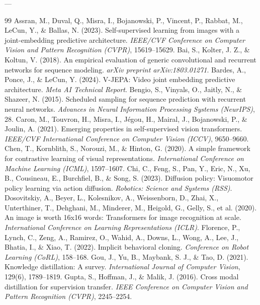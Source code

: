 \documentclass[11pt,a4paper]{article}
\begin{document}
---

\begin{thebibliography}{99}
 Assran, M., Duval, Q., Misra, I., Bojanowski, P., Vincent, P., Rabbat, M., LeCun, Y., \& Ballas, N. (2023). Self-supervised learning from images with a joint-embedding predictive architecture. \textit{IEEE/CVF Conference on Computer Vision and Pattern Recognition (CVPR)}, 15619--15629.
 Bai, S., Kolter, J. Z., \& Koltun, V. (2018). An empirical evaluation of generic convolutional and recurrent networks for sequence modeling. \textit{arXiv preprint arXiv:1803.01271}.
 Bardes, A., Ponce, J., \& LeCun, Y. (2024). V-JEPA: Video joint embedding predictive architecture. \textit{Meta AI Technical Report}.
 Bengio, S., Vinyals, O., Jaitly, N., \& Shazeer, N. (2015). Scheduled sampling for sequence prediction with recurrent neural networks. \textit{Advances in Neural Information Processing Systems (NeurIPS)}, 28.
 Caron, M., Touvron, H., Misra, I., J\'egou, H., Mairal, J., Bojanowski, P., \& Joulin, A. (2021). Emerging properties in self-supervised vision transformers. \textit{IEEE/CVF International Conference on Computer Vision (ICCV)}, 9650--9660.
 Chen, T., Kornblith, S., Norouzi, M., \& Hinton, G. (2020). A simple framework for contrastive learning of visual representations. \textit{International Conference on Machine Learning (ICML)}, 1597--1607.
 Chi, C., Feng, S., Pan, Y., Eric, N., Xu, B., Cousineau, E., Burchfiel, B., \& Song, S. (2023). Diffusion policy: Visuomotor policy learning via action diffusion. \textit{Robotics: Science and Systems (RSS)}.
 Dosovitskiy, A., Beyer, L., Kolesnikov, A., Weissenborn, D., Zhai, X., Unterthiner, T., Dehghani, M., Minderer, M., Heigold, G., Gelly, S., et al. (2020). An image is worth 16x16 words: Transformers for image recognition at scale. \textit{International Conference on Learning Representations (ICLR)}.
 Florence, P., Lynch, C., Zeng, A., Ramirez, O., Wahid, A., Downs, L., Wong, A., Lee, J., Bhatia, I., \& Xiao, T. (2022). Implicit behavioral cloning. \textit{Conference on Robot Learning (CoRL)}, 158--168.
 Gou, J., Yu, B., Maybank, S. J., \& Tao, D. (2021). Knowledge distillation: A survey. \textit{International Journal of Computer Vision}, 129(6), 1789--1819.
 Gupta, S., Hoffman, J., \& Malik, J. (2016). Cross modal distillation for supervision transfer. \textit{IEEE Conference on Computer Vision and Pattern Recognition (CVPR)}, 2245--2254.

\end{thebibliography}
\end{document}
